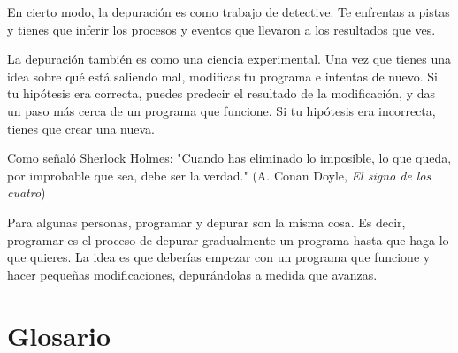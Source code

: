 En cierto modo, la depuración es como trabajo de detective. Te enfrentas a pistas y tienes que inferir los procesos y eventos que llevaron a los resultados que ves.

La depuración también es como una ciencia experimental. Una vez que tienes una idea sobre qué está saliendo mal, modificas tu programa e intentas de nuevo. Si tu hipótesis era correcta, puedes predecir el resultado de la modificación, y das un paso más cerca de un programa que funcione. Si tu hipótesis era incorrecta, tienes que crear una nueva.

Como señaló Sherlock Holmes: "Cuando has eliminado lo imposible, lo que queda, por improbable que sea, debe ser la verdad." (A. Conan Doyle, \textit{El signo de los cuatro})

Para algunas personas, programar y depurar son la misma cosa. Es decir, programar es el proceso de depurar gradualmente un programa hasta que haga lo que quieres. La idea es que deberías empezar con un programa que funcione y hacer pequeñas modificaciones, depurándolas a medida que avanzas.

\section{Glosario}

